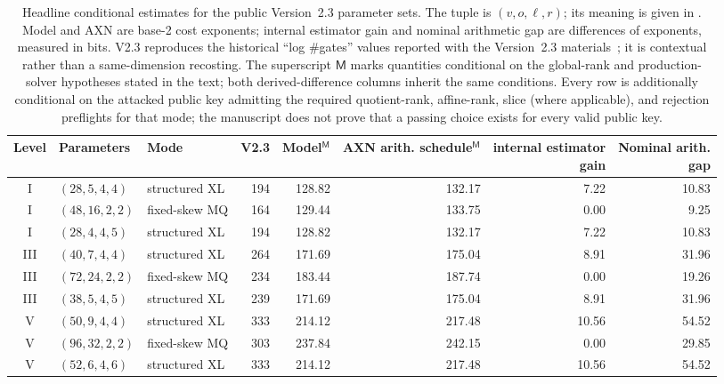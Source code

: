 \documentclass[11pt]{article}
\begin{document}
\begin{table}[H]
\centering
\caption{Headline conditional estimates for the public Version~2.3 parameter
sets.  The tuple is $(v,o,\ell,r)$; its meaning is given in
.  Model and AXN are base-2 cost exponents; internal
estimator gain and nominal arithmetic gap are differences of exponents,
measured in bits.
V2.3 reproduces the historical ``log \#gates'' values reported with the
Version~2.3 materials~\cite{SNOVA23}; it is contextual rather than a
same-dimension recosting.  The superscript
$\mathsf M$ marks quantities conditional on the global-rank and
production-solver hypotheses stated in the text; both derived-difference
columns inherit the same conditions.  Every row is additionally conditional
on the attacked public key admitting the required quotient-rank, affine-rank,
slice (where applicable), and rejection preflights for that mode; the
manuscript does not prove that a passing choice exists for every valid public
key.}
\label{tab:main}
\footnotesize
\setlength{\tabcolsep}{2.3pt}
\renewcommand{\arraystretch}{1.08}
\begin{tabular}{@{}c l l r r r r r@{}}
\toprule
Level & Parameters & Mode & V2.3 & Model$^{\mathsf M}$ &
\shortstack{AXN arith.\\schedule$^{\mathsf M}$} &
\shortstack{internal estimator\\gain} & \shortstack{Nominal arith.\\gap}\\
\midrule
I   & $(28,5,4,4)$  & structured XL & 194 & 128.82 & 132.17 &  7.22 & 10.83\\
I   & $(48,16,2,2)$ & fixed-skew MQ & 164 & 129.44 & 133.75 &  0.00 &  9.25\\
I   & $(28,4,4,5)$  & structured XL & 194 & 128.82 & 132.17 &  7.22 & 10.83\\
\midrule
III & $(40,7,4,4)$  & structured XL & 264 & 171.69 & 175.04 &  8.91 & 31.96\\
III & $(72,24,2,2)$ & fixed-skew MQ & 234 & 183.44 & 187.74 &  0.00 & 19.26\\
III & $(38,5,4,5)$  & structured XL & 239 & 171.69 & 175.04 &  8.91 & 31.96\\
\midrule
V   & $(50,9,4,4)$  & structured XL & 333 & 214.12 & 217.48 & 10.56 & 54.52\\
V   & $(96,32,2,2)$ & fixed-skew MQ & 303 & 237.84 & 242.15 &  0.00 & 29.85\\
V   & $(52,6,4,6)$  & structured XL & 333 & 214.12 & 217.48 & 10.56 & 54.52\\
\bottomrule
\end{tabular}
\end{table}
\end{document}
